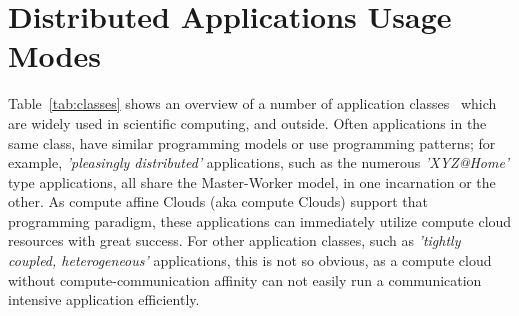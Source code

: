 \documentclass{article}
\newcommand{\I}[1]{\textit{#1}}
\newcommand{\up}{\vspace*{-1em}}
\begin{document}
\up
\section{Distributed Applications Usage Modes}
\label{sec:apps}

 Table~\ref{tab:classes} shows an overview of a number of application
 classes~\cite{dpa_paper} which are widely used in scientific
 computing, and outside.  Often applications in the same class, have
 similar programming models or use programming patterns; for example,
 \I{'pleasingly distributed'} applications, such as the numerous
 \I{'XYZ@Home'} type applications, all share the Master-Worker model,
 in one incarnation or the other.  As compute affine Clouds (aka
 compute Clouds) support that programming paradigm, these applications
 can immediately utilize compute cloud resources with great success.
 For other application classes, such as \I{'tightly coupled,
 heterogeneous'} applications, this is not so obvious, as a compute
 cloud without compute-communication affinity can not easily run a
 communication intensive application efficiently.
 
\end{document}
